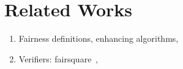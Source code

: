 \section{Related Works}

\begin{enumerate}
	\item Fairness definitions, enhancing algorithms, 
	\item Verifiers: fairsquare~\cite{albarghouthi2017fairsquare}, 
\end{enumerate}